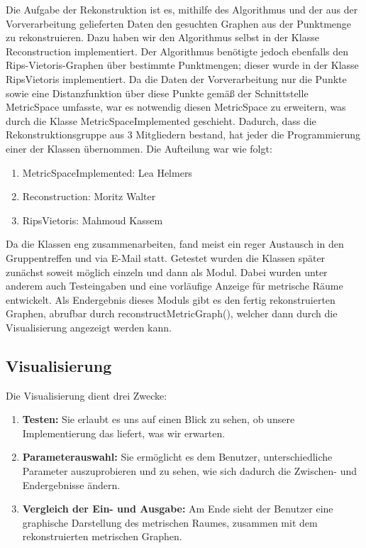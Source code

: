 \documentclass[parskip=half,
 fontsize=12pt, bibtotoc,
 ngerman]
 {article}
\begin{document}
Die Aufgabe der Rekonstruktion ist es, mithilfe des Algorithmus und der aus der Vorverarbeitung gelieferten Daten den gesuchten Graphen aus der Punktmenge zu rekonstruieren. Dazu haben wir den Algorithmus selbst in der Klasse Reconstruction implementiert. Der Algorithmus benötigte jedoch ebenfalls den Rips-Vietoris-Graphen über bestimmte Punktmengen; dieser wurde in der Klasse RipsVietoris implementiert. Da die Daten der Vorverarbeitung nur die Punkte sowie eine Distanzfunktion über diese Punkte gemäß der Schnittstelle MetricSpace umfasste, war es notwendig diesen MetricSpace zu erweitern, was durch die Klasse MetricSpaceImplemented geschieht. Dadurch, dass die Rekonstruktionsgruppe aus 3 Mitgliedern bestand, hat jeder die Programmierung einer der Klassen übernommen. Die Aufteilung war wie folgt:

\begin{enumerate}
\item MetricSpaceImplemented: Lea Helmers
\item Reconstruction: Moritz Walter
\item RipsVietoris: Mahmoud Kassem
\end{enumerate}

Da die Klassen eng zusammenarbeiten, fand meist ein reger Austausch in den Gruppentreffen und via E-Mail statt. Getestet wurden die Klassen später zunächst soweit möglich einzeln und dann als Modul. Dabei wurden unter anderem auch Testeingaben und eine vorläufige Anzeige für metrische Räume entwickelt. Als Endergebnis dieses Moduls gibt es den fertig rekonstruierten Graphen, abrufbar durch reconstructMetricGraph(), welcher dann durch die Visualisierung angezeigt werden kann.

\subsection{Visualisierung}

Die Visualisierung dient drei Zwecke:

\begin{enumerate}
\item \textbf{Testen:} Sie erlaubt es uns auf einen Blick zu sehen, ob unsere Implementierung das liefert, was wir erwarten.
\item \textbf{Parameterauswahl:} Sie ermöglicht es dem Benutzer, unterschiedliche Parameter auszuprobieren und zu sehen, wie sich dadurch die Zwischen- und Endergebnisse ändern.
\item \textbf{Vergleich der Ein- und Ausgabe:} Am Ende sieht der Benutzer eine graphische Darstellung des metrischen Raumes, zusammen mit dem rekonstruierten metrischen Graphen.
\end{enumerate}
\end{document}
